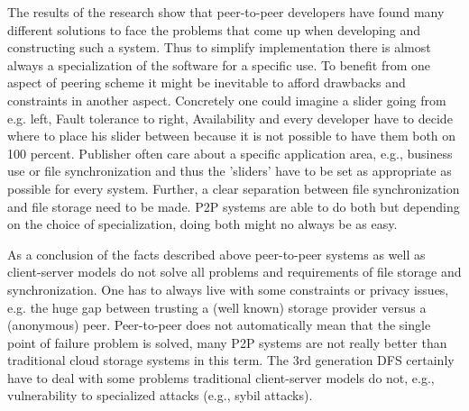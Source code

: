 The results of the research show that peer-to-peer developers have found many different solutions to face the problems that come up when developing and constructing such a system. Thus to simplify implementation there is almost always a specialization of the software for a specific use. To benefit from one aspect of peering scheme it might be inevitable to afford drawbacks and constraints in another aspect. Concretely one could imagine a slider going from e.g. left, Fault tolerance to right, Availability and every developer have to decide where to place his slider between because it is not possible to have them both on 100 percent. Publisher often care about a specific application area, e.g., business use or file synchronization and thus the 'sliders' have to be set as appropriate as possible for every system. Further, a clear separation between file synchronization and file storage need to be made. P2P systems are able to do both but depending on the choice of specialization, doing both might no always be as easy.

As a conclusion of the facts described above peer-to-peer systems as well as client-server models do not solve all problems and requirements of file storage and synchronization. One has to always live with some constraints or privacy issues, e.g. the huge gap between trusting a (well known) storage provider versus a (anonymous) peer. Peer-to-peer does not automatically mean that the single point of failure problem is solved, many P2P systems are not really better than traditional cloud storage systems in this term. The 3rd generation DFS certainly have to deal with some problems traditional client-server models do not, e.g., vulnerability to specialized attacks (e.g., sybil attacks).

